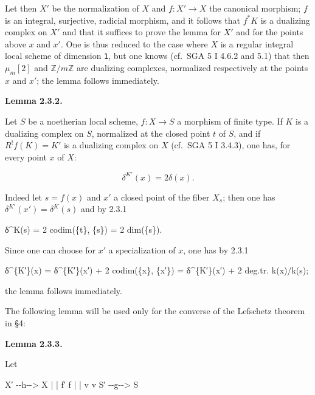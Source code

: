 \documentclass[
]{article}
\newenvironment{Shaded}{}{}
\newcommand{\NormalTok}[1]{#1}
\begin{document}
Let then \(X'\) be the normalization of \(X\) and \(f : X' \to X\) the
canonical morphism; \(f\) is an integral, surjective, radicial morphism,
and it follows that \(f^{*} K\) is a dualizing complex on \(X'\) and
that it suffices to prove the lemma for \(X'\) and for the points above
\(x\) and \(x'\). One is thus reduced to the case where \(X\) is a
regular integral local scheme of dimension \texttt{1}, but one knows
(cf.~SGA 5 I 4.6.2 and 5.1) that then \(\mu_{m}[2]\) and
\(\mathbb{Z}/m\mathbb{Z}\) are dualizing complexes, normalized
respectively at the points \(x\) and \(x'\); the lemma follows
immediately.

\textbf{Lemma 2.3.2.}

Let \(S\) be a noetherian local scheme, \(f : X \to S\) a morphism of
finite type. If \(K\) is a dualizing complex on \(S\), normalized at the
closed point \(t\) of \(S\), and if \(R^{!} f(K) = K'\) is a dualizing
complex on \(X\) (cf.~SGA 5 I 3.4.3), one has, for every point \(x\) of
\(X\):

\[
\delta^{K'}(x) = 2 \delta(x).
\]

Indeed let \(s = f(x)\) and \(x'\) a closed point of the fiber
\(X_{s}\); then one has \(\delta^{K'}(x') = \delta^{K}(s)\) and by 2.3.1

\begin{Shaded}
\begin{Highlighting}[]
\NormalTok{δ\^{}K(s) = 2 codim(\{t\}, \{s\}) = 2 dim(\{s\}).}
\end{Highlighting}
\end{Shaded}

Since one can choose for \(x'\) a specialization of \(x\), one has by
2.3.1

\begin{Shaded}
\begin{Highlighting}[]
\NormalTok{δ\^{}\{K′\}(x) = δ\^{}\{K′\}(x′) + 2 codim(\{x\}, \{x′\}) = δ\^{}\{K′\}(x′) + 2 deg.tr. k(x)/k(s);}
\end{Highlighting}
\end{Shaded}

the lemma follows immediately.

The following lemma will be used only for the converse of the Lefschetz
theorem in §4:

\textbf{Lemma 2.3.3.}

Let

\begin{Shaded}
\begin{Highlighting}[]
\NormalTok{X′ {-}{-}h{-}{-}\textgreater{} X}
\NormalTok{|         |}
\NormalTok{f′        f}
\NormalTok{|         |}
\NormalTok{v         v}
\NormalTok{S′ {-}{-}g{-}{-}\textgreater{} S}
\end{Highlighting}
\end{Shaded}
\end{document}
